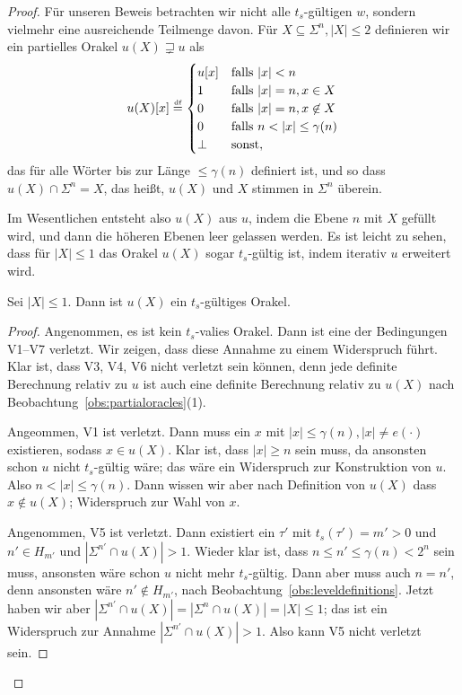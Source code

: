 \begin{proof}
Für unseren Beweis betrachten wir nicht alle $t_{s}$-gültigen $w$, sondern vielmehr eine ausreichende Teilmenge davon.
Für $X \subseteq \Sigma^n, |X|\leq 2$ definieren wir ein partielles Orakel $u(X)\sqsupsetneq u$ als
\[
    u(X)[x] \defeq \begin{cases} u[x] & \text{falls $|x|< n$}\\
    1 & \text{falls $|x|=n, x\in X$}\\
    0 & \text{falls $|x|=n, x\not\in X$}\\
    0 & \text{falls $n<|x|\leq \gamma(n)$} \\ \bot & \text{sonst}, \end{cases}
\]
das für alle Wörter bis zur Länge $\leq\gamma(n)$ definiert ist, und so dass $u(X) \cap \Sigma^n = X$, das heißt, $u(X)$ und $X$ stimmen in $\Sigma^n$ überein.

Im Wesentlichen entsteht also $u(X)$ aus $u$, indem die Ebene $n$ mit $X$ gefüllt wird, und dann die höheren Ebenen leer gelassen werden.
Es ist leicht zu sehen, dass für $|X|\leq 1$ das Orakel $u(X)$ sogar $t_{s}$-gültig ist, indem iterativ $u$ erweitert wird.

\begin{claim}\label{claim:myoracle-validty-leq1}
    Sei $|X|\leq 1$. Dann ist $u(X)$ ein $t_{s}$-gültiges Orakel.
\end{claim}
\begin{proof}
    Angenommen, es ist kein $t_{s}$-valies Orakel. Dann ist eine der Bedingungen V1--V7 verletzt. Wir zeigen, dass diese Annahme zu einem Widerspruch führt.
    Klar ist, dass V3, V4, V6 nicht verletzt sein können, denn jede definite Berechnung relativ zu $u$ ist auch eine definite Berechnung relativ zu $u(X)$ nach Beobachtung~\ref{obs:partialoracles}(1).

    Angeommen, V1 ist verletzt. Dann muss ein $x$ mit $|x|\leq \gamma(n), |x|\neq e(\cdot)$ existieren, sodass $x\in u(X)$.
    Klar ist, dass $|x|\geq n$ sein muss, da ansonsten schon $u$ nicht $t_{s}$-gültig wäre; das wäre ein Widerspruch zur Konstruktion von $u$.
    Also $n<|x|\leq \gamma(n)$. Dann wissen wir aber nach Definition von $u(X)$ dass $x\not\in u(X)$; Widerspruch zur Wahl von $x$.

    Angenommen, V5 ist verletzt. Dann existiert ein $\tau'$ mit $t_{s}(\tau')=m'>0$ und $n'\in H_{m'}$ und $|\Sigma^{n'}\cap u(X)|>1$. Wieder klar ist, dass $n\leq n'\leq\gamma(n)<2^n$ sein muss, ansonsten wäre schon $u$ nicht mehr $t_{s}$-gültig.
    Dann aber muss auch $n=n'$, denn ansonsten wäre $n'\not\in H_{m'}$, nach Beobachtung~\ref{obs:leveldefinitions}.
    Jetzt haben wir aber $|\Sigma^{n'}\cap u(X)|=|\Sigma^n\cap u(X)| = |X|\leq 1$; das ist ein Widerspruch zur Annahme $|\Sigma^{n'}\cap u(X)|>1$. Also kann V5 nicht verletzt sein. 


\end{proof}
\end{proof}

